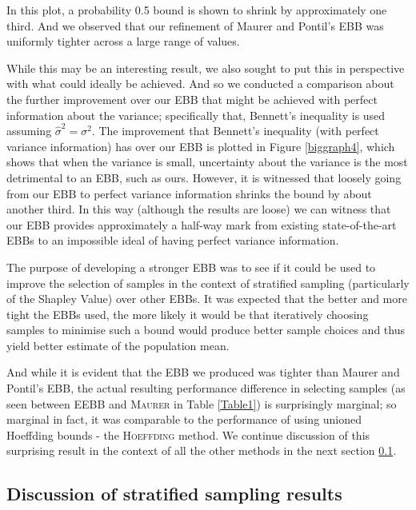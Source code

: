 In this plot, a probability 0.5 bound is shown to shrink by approximately one third.
And we observed that our refinement of Maurer and Pontil's EBB was uniformly tighter across a large range of values.



While this may be an interesting result, we also sought to put this in perspective with what could ideally be achieved.
And so we conducted a comparison about the further improvement over our EBB that might be achieved with perfect information about the variance; specifically that, Bennett's inequality is used assuming $\hat{\sigma}^2=\sigma^2$.
The improvement that Bennett's inequality (with perfect variance information) has over our EBB is plotted in Figure \ref{biggraph4}, which shows that when the variance is small, uncertainty about the variance is the most detrimental to an EBB, such as ours.
However, it is witnessed that loosely going from our EBB to perfect variance information shrinks the bound by about another third.
In this way (although the results are loose) we can witness that our EBB provides approximately a half-way mark from existing state-of-the-art EBBs to an impossible ideal of having perfect variance information.

The purpose of developing a stronger EBB was to see if it could be used to improve the selection of samples in the context of stratified sampling (particularly of the Shapley Value) over other EBBs.
It was expected that the better and more tight the EBBs used, the more likely it would be that iteratively choosing samples to minimise such a bound would produce better sample choices and thus yield better estimate of the population mean.

And while it is evident that the EBB we produced was tighter than Maurer and Pontil's EBB, the actual resulting performance difference in selecting samples (as seen between \textsc{EEBB} and \textsc{Maurer} in Table \ref{Table1}) is surprisingly marginal; so marginal in fact, it was comparable to the performance of using unioned Hoeffding bounds - the \textsc{Hoeffding} method.
We continue discussion of this surprising result in the context of all the other methods in the next section \ref{subsection:main_discussion}.



\subsection{Discussion of stratified sampling results}\label{subsection:main_discussion}



